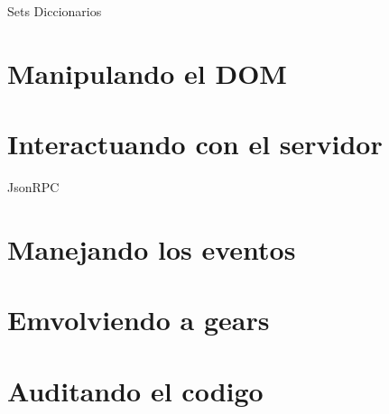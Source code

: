 Sets
Diccionarios

\section{Manipulando el DOM}

\section{Interactuando con el servidor}


JsonRPC

\section{Manejando los eventos}

\section{Emvolviendo a gears}

\section{Auditando el codigo}
